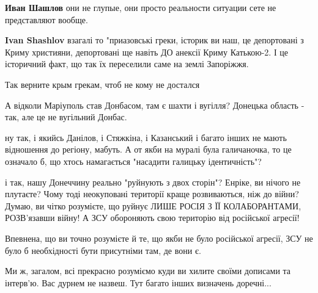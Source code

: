 \begin{itemize}
\begin{itemize}
\textbf{Иван Шашлов} они не глупые, они просто реальности ситуации сете не представляют вообще.

\textbf{Ivan Shashlov} взагалі то "приазовські греки, історик ви наш, це депортовані з Криму християни, депортовані ще навіть ДО анексії Криму Катькою-2. І це історичний факт, що так їх переселили саме на землі Запоріжжя.

Так верните крым грекам, чтоб не кому не достался

А відколи Маріуполь став Донбасом, там є шахти і вугілля? Донецька область - так, але це не вугільний Донбас.
\end{itemize} %


ну так, і якийсь Данілов, і Стяжкіна, і Казанський і багато інших не мають
відношення до регіону, мабуть. А от якби на муралі була галичаночка, то це
означало б, що хтось намагається "насадити галицьку ідентичність"?

і так, нашу Донеччину реально "руйнують з двох сторін"? Енріке, ви нічого не
плутаєте? Чому тоді неокуповані території краще розвиваються, ніж до війни?
Думаю, ви чітко розумієте, що руйнує ЛИШЕ РОСІЯ З ЇЇ КОЛАБОРАНТАМИ, РОЗВ'язавши
війну! А ЗСУ обороняють свою територію від російської агресії!

Впевнена, що ви точно розумієте й те, що якби не було російської агресії, ЗСУ
не було б необхідності бути присутніми там, де вони є.

Ми ж, загалом, всі прекрасно розуміємо куди ви хилите своїми дописами та
інтерв'ю. Вас дурнем не назвеш. Тут багато інших визначень доречні...

\end{itemize} %
